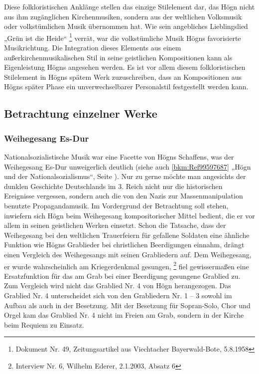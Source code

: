 \documentclass[a4paper]{article}
\begin{document}
Diese folkloristischen Anklänge stellen das einzige Stilelement dar, das
Högn nicht aus ihm zugänglichen Kirchenmusiken, sondern aus der
weltlichen Volksmusik oder volkstümlichen Musik übernommen hat. Wie
sein angebliches Lieblingslied „Grün ist die Heide“  \footnote{Dokument
Nr. 49, Zeitungsartikel aus Viechtacher Bayerwald-Bote, 5.8.1958}
verrät, war die volkstümliche Musik Högns favorisierte Musikrichtung.
Die Integration dieses Elements aus einem außerkirchenmusikalischen
Stil in seine geistlichen Kompositionen kann als Eigenleistung Högns
angesehen werden. Es ist vor allem diesem folkloristischen Stilelement
in Högns spätem Werk zuzuschreiben, dass an Kompositionen aus Högns
später Phase ein unverwechselbarer Personalstil festgestellt werden
kann.

\clearpage\subsection{Betrachtung einzelner Werke}
\hypertarget{RefHeadingToc100333752}{}\subsubsection{Weihegesang Es-Dur}
\label{bkm:Ref100062450}\hypertarget{RefHeadingToc100333753}{}\label{bkm:Ref100062461}\label{bkm:Ref100062456}Nationalsozialistische
Musik war eine Facette von Högns Schaffens, was der Weihegesang Es-Dur
unweigerlich deutlich (siehe auch \ref{bkm:Ref99597687} „Högn und der
Nationalsozialismus“, Seite \pageref{bkm:Ref99597697}). Nur zu gerne
möchte man angesichts der dunklen Geschichte Deutschlands im 3. Reich
nicht nur die historischen Ereignisse vergessen, sondern auch die von
den Nazis zur Massenmanipulation benutzte Propagandamusik. Im
Vordergrund der Betrachtung soll stehen, inwiefern sich Högn beim
Weihegesang kompositorischer Mittel bedient, die er vor allem in seinen
geistlichen Werken einsetzt. Schon die Tatsache, dass der Weihegesang
bei den weltlichen Trauerfeiern für gefallene Soldaten eine ähnliche
Funktion wie Högns Grablieder bei christlichen Beerdigungen einnahm,
drängt einen Vergleich des Weihegesangs mit seinen Grabliedern auf. Dem
Weihegesang, er wurde wahrscheinlich am Kriegerdenkmal
gesungen, \footnote{Interview Nr. 6, Wilhelm Ederer, 2.1.2003, Absatz
6} fiel gewissermaßen eine Ersatzfunktion für das am Grab bei einer
Beerdigung gesungene Grablied zu. Zum Vergleich wird nicht das Grablied
Nr. 4 von Högn herangezogen. Das Grablied Nr. 4 unterscheidet sich von
den Grabliedern Nr. 1 – 3 sowohl im Aufbau als auch in der Besetzung.
Mit der Besetzung für Sopran-Solo, Chor und Orgel kam das Grablied Nr.
4 nicht im Freien am Grab, sondern in der Kirche beim Requiem zu
Einsatz.
\end{document}
